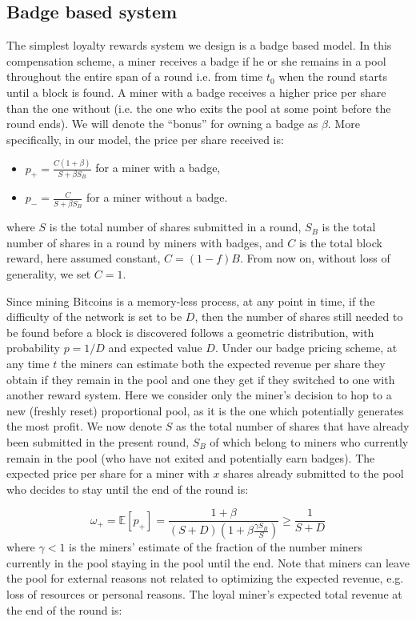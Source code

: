 \documentclass{article}
\theoremstyle{plain}
\theoremstyle{definition}
\begin{document}
\subsection{Badge based system}

The simplest loyalty rewards system we design is a badge based model. 
In this compensation scheme, a miner receives a badge if he or she remains
in a pool throughout the entire span of a round i.e. from time $t_0$
when the round starts until a block is found. A miner with a badge receives 
a higher price per share than the one without (i.e. the one who exits the 
pool at some point before the round ends). We will denote the ``bonus'' 
for owning a badge as $\beta$. More specifically, in our model, the price
per share received is:
\begin{itemize}
\item $p_{+} = \frac{C(1 + \beta)}{S + \beta S_B}$ for a miner with a badge,
\item $p_{-} = \frac{C}{S + \beta S_B}$ for a miner without a badge.
\end{itemize}
 where $S$ is the total number of shares submitted in a round, $S_B$ is 
the total number of shares in a round by miners with badges, and $C$ is
the total block reward, here assumed constant, $C = (1-f)B$. From now
on, without loss of generality, we set $C = 1$. 

Since mining Bitcoins is a memory-less process, at any point in time,
if the difficulty of the network is set to be $D$, then the number of 
shares still needed to be found before a block is discovered follows a geometric distribution, with probability $p = 1/D$ and expected value $D$.
Under our badge pricing scheme, at any time $t$ the miners can estimate
both the expected revenue per share they obtain if they remain in the pool 
and one they get if they switched to one with another reward system.
Here we consider only the miner's decision to hop to a new (freshly reset)
proportional pool, as it is the one which potentially generates the most 
profit. We now denote $S$ as the total number of shares that have already 
been submitted in the present round, $S_B$ of which belong to miners who 
currently remain in the pool (who have not exited and potentially earn 
badges). The expected price per share for a miner with $x$ shares already 
submitted to the pool who decides to stay until the end of the round is:

\[\omega_{+} = \mathbb{E}[p_{+}] = \frac{1 + \beta}{(S + D)\left(1 + \beta \frac{\gamma S_B}{S}\right)} \ge \frac{1}{S + D}\]
where $\gamma < 1$ is the miners' estimate of the fraction of the number 
miners currently in the pool staying in the pool until the end. Note that
miners can leave the pool for external reasons not related to optimizing
the expected revenue, e.g. loss of resources or personal reasons.
The loyal miner's expected total revenue at the end of the round is: 
\end{document}
